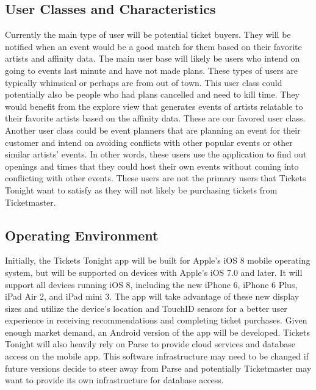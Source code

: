 		\subsection{User Classes and Characteristics}
		  Currently the main type of user will be potential ticket buyers. They will be notified when an event 
		  would be a good match for them based on their favorite artists and affinity data. The main user base 
		  will likely be users who intend on going to events last minute and have not made plans. These types of 
		  users are typically whimsical or perhaps are from out of town. This user class could potentially also be 
		  people who had plans cancelled and need to kill time. They would benefit from the explore view that 
		  generates events of artists relatable to their favorite artists based on the affinity data. These are our 
		  favored user class. Another user class could be event planners that are planning an event for their 
		  customer and intend on avoiding conflicts with other popular events or other similar artists’ events. In 
		  other words, these users use the application to find out openings and times that they could host their 
		  own events without coming into conflicting with other events. These users are not the primary users 
		  that Tickets Tonight want to satisfy as they will not likely be purchasing tickets from Ticketmaster.

		 \subsection{Operating Environment}
		  Initially, the Tickets Tonight app will be built for Apple’s iOS 8 mobile operating system, but will be 
		  supported on devices with Apple’s iOS 7.0 and later. It will support all devices running iOS 8, including 
		  the new iPhone 6, iPhone 6 Plus, iPad Air 2, and iPad mini 3.  The app will take advantage of these new 
		  display sizes and utilize the device’s location and TouchID sensors for a better user experience in 
		  receiving recommendations and completing ticket purchases. Given enough market demand, an 
		  Android version of the app will be developed. Tickets Tonight will also heavily rely on Parse to provide 
		  cloud services and database access on the mobile app. This software infrastructure may need to be 
		  changed if future versions decide to steer away from Parse and potentially Ticketmaster may want to 
		  provide its own infrastructure for database access.
		  
